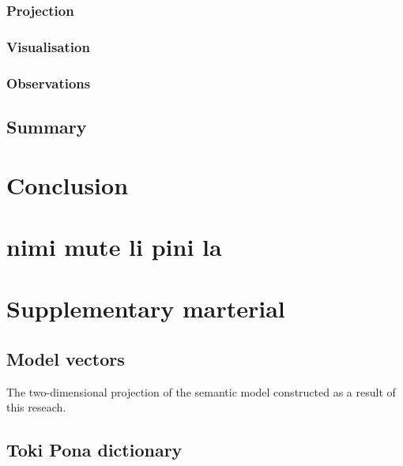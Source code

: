 \documentclass[14pt, a4paper]{extreport}
\begin{document}
    \subsection{Projection}
    \subsection{Visualisation}
    \subsection{Observations}
  \section{Summary}



\chapter{Conclusion}

\chapter{nimi mute li pini la}



\printbibliography[heading=bibintoc, title={References}, nottype=online]
\printbibliography[heading=bibintoc, title={Online resources}, type=online]



\chapter{Supplementary marterial}
  \section{Model vectors}

The two-dimensional projection of the semantic model constructed as a result of this reseach.


  \section{Toki Pona dictionary}
\end{document}
